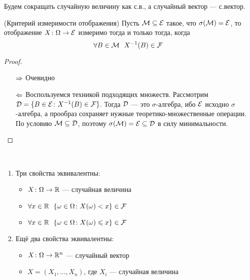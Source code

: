 \begin{note}
	Будем сокращать случайную величину как с.в., а случайный вектор --- с.вектор.
\end{note}

\begin{lemma} (Критерий измеримости отображения)
	Пусть $\mathcal{M} \subseteq \mathcal{E}$ такое, что $\sigma(\mathcal{M}) = \mathcal{E}$, то отображение $X \colon \Omega \to \mathcal{E}$ измеримо тогда и только тогда, когда
	\[
		\forall B \in \cM\ \ X^{-1}(B) \in \F
	\]
\end{lemma}

\begin{proof}~
	\begin{itemize}
		\item[$\Rightarrow$] Очевидно
		
		\item[$\Leftarrow$] Воспользуемся техникой подходящих множеств. Рассмотрим $\mathcal{D} = \{B \in \mathcal{E} \colon X^{-1}(B) \in \mathcal{F}\}$. Тогда $\mathcal{D}$ --- это $\sigma$-алгебра, ибо $\mathcal{E}$ исходно $\sigma$-алгебра, а прообраз сохраняет нужные теоретико-множественные операции. По условию $\mathcal{M} \subseteq \mathcal{D}$, поэтому $\sigma(\mathcal{M}) = \mathcal{E} \subseteq \mathcal{D}$ в силу минимальности.
	\end{itemize}
\end{proof}

\begin{corollary}~
	\begin{enumerate}
		\item Три свойства эквивалентны:
		\begin{itemize}
			\item $X \colon \Omega \to \mathbb{R}$ --- случайная величина
			
			\item $\forall x \in \mathbb{R}\ \ \{\omega \in \Omega \colon X(\omega) < x\} \in \mathcal{F}$
			
			\item $\forall x \in \mathbb{R}\ \ \{\omega \in \Omega \colon X(\omega) \leqslant x\} \in \mathcal{F}$
		\end{itemize}
		
		\item Ещё два свойства эквивалентны:
		\begin{itemize}
			\item $X \colon \Omega \to \mathbb{R}^n$ --- случайный вектор
			
			\item $X = (X_1, \ldots, X_n)$, где $X_i$ --- случайная величина
		\end{itemize}
	\end{enumerate}
\end{corollary}

